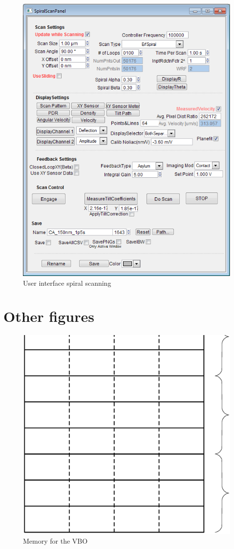 \begin{figure}[H]
  \centering
  \includegraphics[scale=1]{images/AsylumGUI.png}
    \caption{User interface spiral scanning}
  \label{AsylumGUI}
\end{figure}

\section{Other figures}


\begin{figure}[H]
  \centering
  \includegraphics[scale=0.2]{images/memory.eps}
    \caption{Memory for the VBO}
  \label{memoryVAO}
\end{figure}
